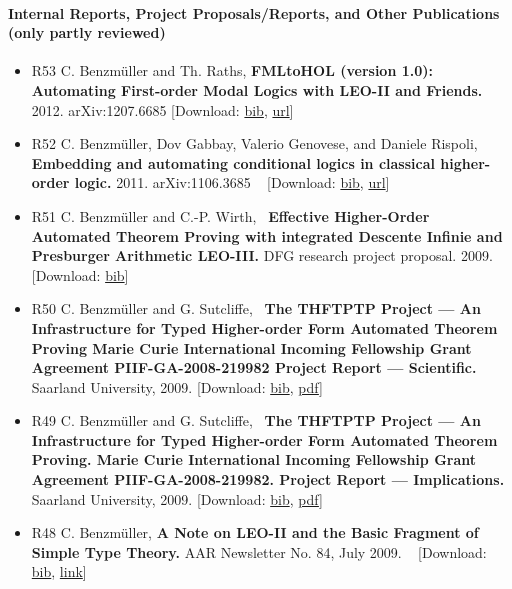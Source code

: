 \documentclass{article}
\newcommand{\emdash}{---}
\newcommand{\tmstrong}[1]{\textbf{#1}}
\newcommand{\tmtextbf}[1]{{\bfseries{#1}}}
\newenvironment{itemizedot}{\begin{itemize} \renewcommand{\labelitemi}{$\bullet$}\renewcommand{\labelitemii}{$\bullet$}\renewcommand{\labelitemiii}{$\bullet$}\renewcommand{\labelitemiv}{$\bullet$}}{\end{itemize}}
\begin{document}
\paragraph{Internal Reports, Project Proposals/Reports, and Other Publications
(only partly reviewed)}

\begin{itemizedot}
  \item [R53] C. Benzm\"uller and Th. Raths, {\tmstrong{FMLtoHOL (version
  1.0): Automating First-order Modal Logics with LEO-II and Friends.}} 2012.
  arXiv:1207.6685 {\color{grey} [Download: {\small
  \href{../papers/R53.bib}{bib}}, {\small
  \href{http://arxiv.org/abs/1207.6685}{url{\tmstrong{}}}}]}
  
  \item [R52] C. Benzm\"uller, Dov Gabbay, Valerio Genovese, and Daniele
  Rispoli, {\tmstrong{Embedding and automating conditional logics in classical
  higher-order logic.}} 2011. arXiv:1106.3685 \ {\color{grey} [Download:
  {\small \href{../papers/R52.bib}{bib}}, {\small
  \href{http://arxiv.org/abs/1106.3685}{url{\tmstrong{}}}}]}
  
  \item [R51] C. Benzm\"uller and C.-P. Wirth, \ {\small \tmtextbf{Effective
  Higher-Order Automated Theorem Proving with integrated Descente Infinie and
  Presburger Arithmetic LEO-III.}} DFG research project proposal. 2009.
  {\color{grey} [Download: {\small \href{../papers/R50.bib}{bib}}]}
  
  \item [R50] C. Benzm\"uller and G. Sutcliffe, \ {\small \tmtextbf{The
  THFTPTP Project {\emdash} An Infrastructure for Typed Higher-order Form
  Automated Theorem Proving Marie Curie International Incoming Fellowship
  Grant Agreement PIIF-GA-2008-219982 Project Report {\emdash} Scientific.}
  }Saarland University, 2009. {\color{grey} [Download: {\small
  \href{../papers/R50.bib}{bib},} {\small \href{../papers/R50.pdf}{pdf}}]}
  
  \item [R49] C. Benzm\"uller and G. Sutcliffe, \ {\small \tmtextbf{The
  THFTPTP Project {\emdash} An Infrastructure for Typed Higher-order Form
  Automated Theorem Proving. Marie Curie International Incoming Fellowship
  Grant Agreement PIIF-GA-2008-219982. Project Report {\emdash} Implications.}
  }Saarland University, 2009. {\color{grey} [Download: {\small
  \href{../papers/R49.bib}{bib},} {\small \href{../papers/R49.pdf}{pdf}}]}
  
  \item [R48] C. Benzm\"uller, {\small \tmtextbf{A Note on LEO-II and the
  Basic Fragment of Simple Type Theory.}} AAR Newsletter No. 84, July 2009. \
  {\color{grey} [Download: {\small \href{../papers/R48.bib}{bib},} {\small
  \href{http://www.AARInc.org/Newsletters/084-2009-07.html}{link}}]}
  

\end{itemizedot}
\end{document}
